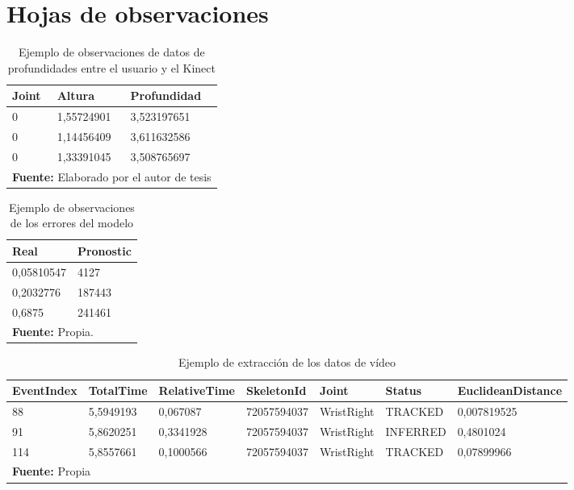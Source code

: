 \section{Hojas de observaciones}
\begin{table}[H]
\begin{center}
\caption{Ejemplo de observaciones de datos de profundidades entre el usuario y el Kinect}
\label{tab:obsDepth}
\begin{tabular}{|l|l|l|}
\hline
Joint & Altura & Profundidad \\ \hline
0 & 1,55724901 & 3,523197651 \\ \hline
0 & 1,14456409 & 3,611632586 \\ \hline
0 & 1,33391045 & 3,508765697 \\ \hline
\multicolumn{3}{l}{\textbf{Fuente:} Elaborado por el autor de tesis}
\end{tabular}
\end{center}
\end{table}

\begin{table}[H]
\begin{center}
\caption{Ejemplo de observaciones de los errores del modelo}
\label{tab:obsErrores}
\begin{tabular}{|l|l|}
\hline
Real & Pronostic \\ \hline
0,05810547 & 4127 \\ \hline
0,2032776 & 187443 \\ \hline
0,6875 & 241461 \\ \hline
\multicolumn{2}{l}{\textbf{Fuente:} Propia.}
\end{tabular}
\end{center}
\end{table}

\begin{table}[H]
\begin{center}
\caption{Ejemplo de extracci\'on de los datos de v\'ideo}
\label{tab:obsVideoData}
\begin{tabular}{|l|l|l|l|l|l|l|}
\hline
EventIndex & TotalTime & RelativeTime  & SkeletonId & Joint & Status & EuclideanDistance \\ \hline
88 & 5,5949193 & 0,067087 & 72057594037 & WristRight & TRACKED & 0,007819525\\ \hline
91 & 5,8620251 & 0,3341928 & 72057594037 & WristRight & INFERRED & 0,4801024\\ \hline
114 & 5,8557661 & 0,1000566 & 72057594037 & WristRight & TRACKED & 0,07899966\\ \hline
\multicolumn{7}{l}{\textbf{Fuente:} Propia}
\end{tabular}
\end{center}
\end{table}

